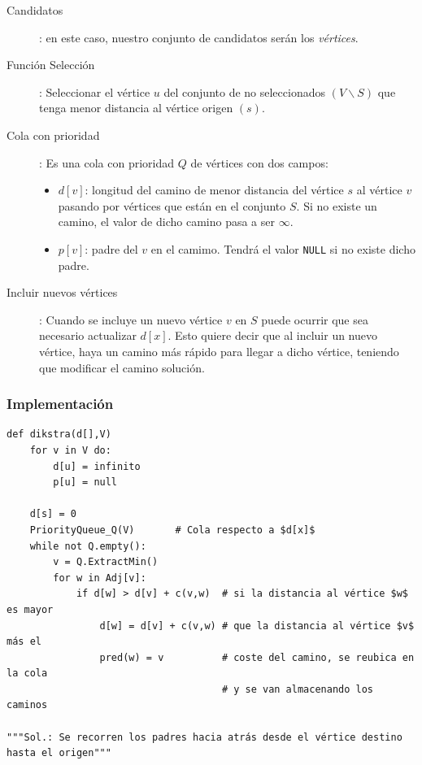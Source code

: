 \documentclass[10pt,a4paper,spanish]{report}
\theoremstyle{definition}
\theoremstyle{remark}
\begin{document}
\begin{description}
    \item [Candidatos]: en este caso, nuestro conjunto de candidatos serán los \textit{\textcolor{electriccrimson}{vértices}}.
    \item [Función Selección]: Seleccionar el vértice $u$ del conjunto de no seleccionados $(V\backslash S)$ que tenga menor distancia al vértice origen $(s)$.
    \item [Cola con prioridad]: Es una cola con prioridad $Q$ de vértices con dos campos:
    \begin{itemize}
        \item \textcolor{electriccrimson}{$d[v]$}: longitud del camino de menor distancia del vértice $s$ al vértice $v$ pasando por vértices que están en el conjunto $S$. Si no existe un camino, el valor de dicho camino pasa a ser $\infty$.
        \item \textcolor{electriccrimson}{$p[v]$}: padre del $v$ en el camimo. Tendrá el valor \verb*|NULL| si no existe dicho padre.
    \end{itemize}

    \item [Incluir nuevos vértices]: Cuando se incluye un nuevo vértice $v$ en $S$ puede ocurrir que sea necesario actualizar $d[x]$. Esto quiere decir que al incluir un nuevo vértice, haya un camino más rápido para llegar a dicho vértice, teniendo que modificar el camino solución.
\end{description}

\subsubsection{\textcolor{electriccrimson}Implementación}

\begin{verbatim}
def dikstra(d[],V)
    for v in V do:
        d[u] = infinito
        p[u] = null

    d[s] = 0
    PriorityQueue_Q(V)       # Cola respecto a $d[x]$
    while not Q.empty():
        v = Q.ExtractMin()
        for w in Adj[v]:
            if d[w] > d[v] + c(v,w)  # si la distancia al vértice $w$ es mayor 
                d[w] = d[v] + c(v,w) # que la distancia al vértice $v$ más el 
                pred(w) = v          # coste del camino, se reubica en la cola 
                                     # y se van almacenando los caminos

"""Sol.: Se recorren los padres hacia atrás desde el vértice destino hasta el origen"""
\end{verbatim}
\end{document}
